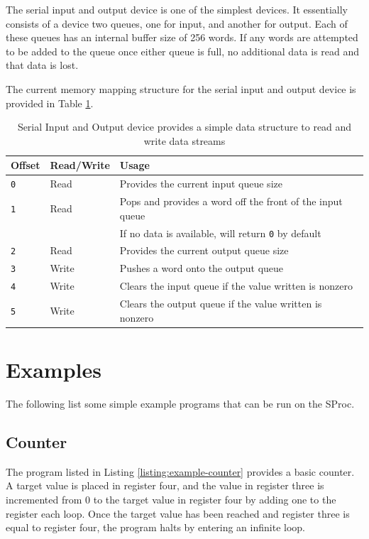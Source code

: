 \documentclass{article}
\begin{document}
The serial input and output device is one of the simplest devices. It essentially consists of a device two queues, one for input, and another for output. Each of these queues has an internal buffer size of 256 words. If any words are attempted to be added to the queue once either queue is full, no additional data is read and that data is lost.

The current memory mapping structure for the serial input and output device is provided in Table \ref{table:dev-serial-io}.

\begin{table}[h!]
	\centering
	\begin{tabular}{l|ll}
		\hline
		Offset & Read/Write & Usage \\
		\hline
		\texttt{0} & Read & Provides the current input queue size \\
		\texttt{1} & Read & Pops and provides a word off the front of the input queue \\
		& & If no data is available, will return \texttt{0} by default \\
		\texttt{2} & Read & Provides the current output queue size \\
		\texttt{3} & Write & Pushes a word onto the output queue \\
		\texttt{4} & Write & Clears the input queue if the value written is nonzero \\
		\texttt{5} & Write & Clears the output queue if the value written is nonzero \\
		\hline
	\end{tabular}
	\caption{Serial Input and Output device provides a simple data structure to read and write data streams}
	\label{table:dev-serial-io}
\end{table}

\pagebreak

\section{Examples}

The following list some simple example programs that can be run on the SProc.

\subsection{Counter}

The program listed in Listing \ref{listing:example-counter} provides a basic counter. A target value is placed in register four, and the value in register three is incremented from 0 to the target value in register four by adding one to the register each loop. Once the target value has been reached and register three is equal to register four, the program halts by entering an infinite loop.
\end{document}
